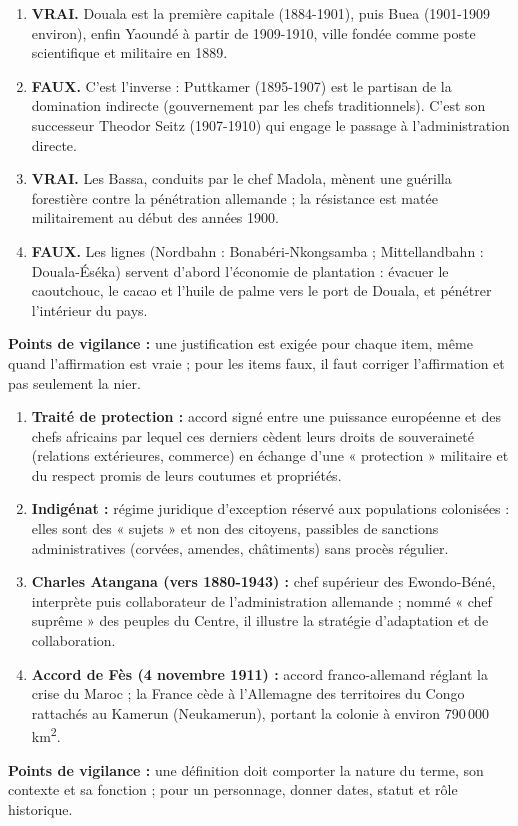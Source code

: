 \documentclass[11pt]{article}
\begin{document}
\begin{corrige}
\begin{enumerate}
    \item \textbf{VRAI.} Douala est la première capitale (1884-1901), puis Buea (1901-1909 environ), enfin Yaoundé à partir de 1909-1910, ville fondée comme poste scientifique et militaire en 1889.
    \item \textbf{FAUX.} C'est l'inverse : Puttkamer (1895-1907) est le partisan de la domination indirecte (gouvernement par les chefs traditionnels). C'est son successeur Theodor Seitz (1907-1910) qui engage le passage à l'administration directe.
    \item \textbf{VRAI.} Les Bassa, conduits par le chef Madola, mènent une guérilla forestière contre la pénétration allemande ; la résistance est matée militairement au début des années 1900.
    \item \textbf{FAUX.} Les lignes (Nordbahn : Bonabéri-Nkongsamba ; Mittellandbahn : Douala-Éséka) servent d'abord l'économie de plantation : évacuer le caoutchouc, le cacao et l'huile de palme vers le port de Douala, et pénétrer l'intérieur du pays.
\end{enumerate}
\textbf{Points de vigilance :} une justification est exigée pour chaque item, même quand l'affirmation est vraie ; pour les items faux, il faut corriger l'affirmation et pas seulement la nier.
\end{corrige}

\begin{corrige}
\begin{enumerate}
    \item \textbf{Traité de protection :} accord signé entre une puissance européenne et des chefs africains par lequel ces derniers cèdent leurs droits de souveraineté (relations extérieures, commerce) en échange d'une « protection » militaire et du respect promis de leurs coutumes et propriétés.
    \item \textbf{Indigénat :} régime juridique d'exception réservé aux populations colonisées : elles sont des « sujets » et non des citoyens, passibles de sanctions administratives (corvées, amendes, châtiments) sans procès régulier.
    \item \textbf{Charles Atangana (vers 1880-1943) :} chef supérieur des Ewondo-Béné, interprète puis collaborateur de l'administration allemande ; nommé « chef suprême » des peuples du Centre, il illustre la stratégie d'adaptation et de collaboration.
    \item \textbf{Accord de Fès (4 novembre 1911) :} accord franco-allemand réglant la crise du Maroc ; la France cède à l'Allemagne des territoires du Congo rattachés au Kamerun (Neukamerun), portant la colonie à environ 790\,000 km\textsuperscript{2}.
\end{enumerate}
\textbf{Points de vigilance :} une définition doit comporter la nature du terme, son contexte et sa fonction ; pour un personnage, donner dates, statut et rôle historique.
\end{corrige}
\end{document}
